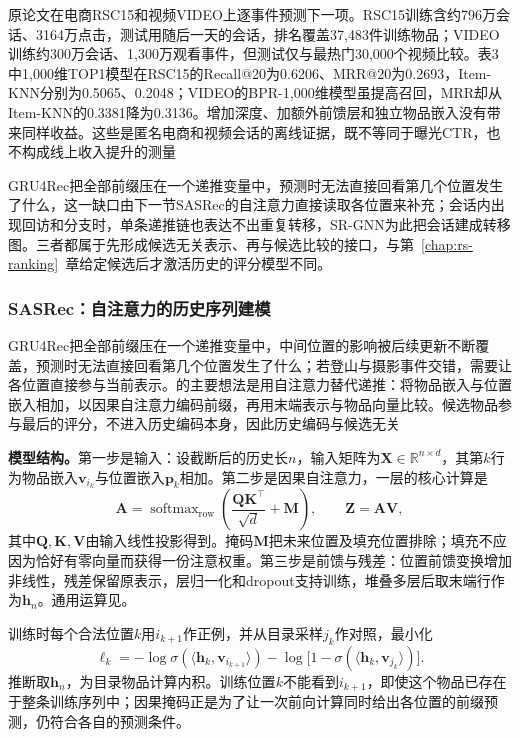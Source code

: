 原论文在电商RSC15和视频VIDEO上逐事件预测下一项。RSC15训练含约796万会话、3164万点击，测试用随后一天的会话，排名覆盖37,483件训练物品；VIDEO训练约300万会话、1,300万观看事件，但测试仅与最热门30,000个视频比较。表3中1,000维TOP1模型在RSC15的Recall@20为0.6206、MRR@20为0.2693，Item-KNN分别为0.5065、0.2048；VIDEO的BPR-1,000维模型虽提高召回，MRR却从Item-KNN的0.3381降为0.3136。增加深度、加额外前馈层和独立物品嵌入没有带来同样收益。这些是匿名电商和视频会话的离线证据，既不等同于曝光CTR，也不构成线上收入提升的测量

GRU4Rec把全部前缀压在一个递推变量中，预测时无法直接回看第几个位置发生了什么，这一缺口由下一节SASRec的自注意力直接读取各位置来补充；会话内出现回访和分支时，单条递推链也表达不出重复转移，SR-GNN为此把会话建成转移图。三者都属于先形成候选无关表示、再与候选比较的接口，与第~\ref{chap:rs-ranking}~章给定候选后才激活历史的评分模型不同。
\subsubsection{SASRec：自注意力的历史序列建模}
\label{sec:rs-sasrec}

GRU4Rec把全部前缀压在一个递推变量中，中间位置的影响被后续更新不断覆盖，预测时无法直接回看第几个位置发生了什么；若登山与摄影事件交错，需要让各位置直接参与当前表示。的主要想法是用自注意力替代递推：将物品嵌入与位置嵌入相加，以因果自注意力编码前缀，再用末端表示与物品向量比较。候选物品参与最后的评分，不进入历史编码本身，因此历史编码与候选无关

\textbf{模型结构。}第一步是输入：设截断后的历史长$n$，输入矩阵为$\bm{X}\in\mathbb{R}^{n\times d}$，其第$k$行为物品嵌入$\bm{v}_{i_k}$与位置嵌入$\bm{p}_k$相加。第二步是因果自注意力，一层的核心计算是
\begin{equation}
  \bm{A}=\operatorname{softmax}_{\mathrm{row}}
  \left(\frac{\bm{Q}\bm{K}^{\top}}{\sqrt d}+\bm{M}\right),
  \qquad \bm{Z}=\bm{A}\bm{V},
  \label{eq:rs-sasrec-attention}
\end{equation}
其中$\bm{Q},\bm{K},\bm{V}$由输入线性投影得到。掩码$\bm{M}$把未来位置及填充位置排除；填充不应因为恰好有零向量而获得一份注意权重。第三步是前馈与残差：位置前馈变换增加非线性，残差保留原表示，层归一化和dropout支持训练，堆叠多层后取末端行作为$\bm{h}_n$。通用运算见。

训练时每个合法位置$k$用$i_{k+1}$作正例，并从目录采样$j_k$作对照，最小化
\begin{equation}
  \ell_k=-\log\sigma(\langle\bm{h}_k,\bm{v}_{i_{k+1}}\rangle)
  -\log\bigl[1-\sigma(\langle\bm{h}_k,\bm{v}_{j_k}\rangle)\bigr].
  \label{eq:rs-sasrec-loss}
\end{equation}
推断取$\bm{h}_n$，为目录物品计算内积。训练位置$k$不能看到$i_{k+1}$，即使这个物品已存在于整条训练序列中；因果掩码正是为了让一次前向计算同时给出各位置的前缀预测，仍符合各自的预测条件。

